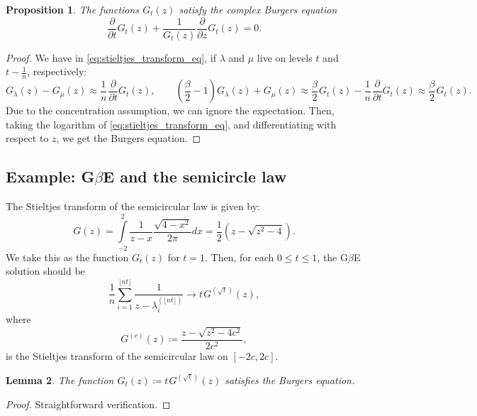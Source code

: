 \documentclass[letterpaper,11pt,oneside,reqno]{article}
\numberwithin{equation}{section}
\newcommand{\ssp}{\hspace{1pt}}
\newtheorem{proposition}{Proposition}[section]
\newtheorem{lemma}[proposition]{Lemma}
\theoremstyle{definition}
\begin{document}
\begin{proposition}
	The functions $G_t(z)$ satisfy the complex Burgers equation
	\begin{equation*}
		\frac{\partial}{\partial t}G_t(z) +
		\frac{1}{G_t(z)}\frac{\partial}{\partial z}G_t(z) = 0.
	\end{equation*}
\end{proposition}
\begin{proof}
	We have in \eqref{eq:stieltjes_transform_eq},
	if $\lambda$ and $\mu$ live on levels $t$ and $t-\frac{1}{n}$, 
	respectively:
	\begin{equation*}
		G_\lambda(z)-G_\mu(z)\approx 
		\frac{1}{n}\ssp\frac{\partial}{\partial t}G_t(z),
		\qquad 
		\left( \frac{\beta}{2}-1 \right)G_\lambda(z) + G_\mu(z) \approx
		\frac{\beta}{2}\ssp G_t(z) - \frac{1}{n}\ssp\frac{\partial}{\partial t}G_t(z)
		\approx
		\frac{\beta}{2}\ssp G_t(z) .
	\end{equation*}
	Due to the concentration assumption, we can ignore the expectation.
	Then, taking the logarithm of \eqref{eq:stieltjes_transform_eq},
	and differentiating with respect to $z$, 
	we get the Burgers equation.
\end{proof}

\subsection{Example: G$\beta$E and the semicircle law}

The Stieltjes transform of the semicircular law is given by:
\begin{equation*}
	G(z) = \int\limits_{-2}^{2}\frac{1}{z-x}\frac{\sqrt{4-x^2}}{2\pi}dx =
	\frac{1}{2} \left(z-\sqrt{z^2-4}\right).
\end{equation*}
We take this as the function $G_t(z)$ for $t=1$.
Then, for each $0\le t\le 1$, the 
G$\beta$E solution should be 
\begin{equation*}
	\frac{1}{n}\sum_{i=1}^{\lfloor nt \rfloor }\frac{1}{z-\lambda_i^{(\lfloor nt \rfloor )}}
	\to t\ssp G^{(\sqrt t)}(z),
\end{equation*}
where 
\begin{equation*}
	G^{(c)}(z) \coloneqq \frac{z-\sqrt{z^2-4c^2}}{2c^2},
\end{equation*}
is the Stieltjes transform of the semicircular law on $[-2c, 2c]$.

\begin{lemma}
	\label{lemma:semicircle_and_burgers}
	The function $G_t(z)\coloneqq t\ssp G^{(\sqrt t)}(z)$
	satisfies the Burgers equation.
\end{lemma}
\begin{proof}
	Straightforward verification.
\end{proof}
\end{document}
